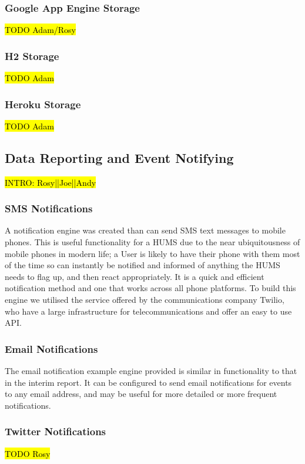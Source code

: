 \documentclass[10pt,a4paper]{article}
\begin{document}
\subsubsection{Google App Engine Storage}
\hl{TODO Adam/Rosy}

\subsubsection{H2 Storage}
\hl{TODO Adam}

\subsubsection{Heroku Storage}
\hl{TODO Adam}

\subsection{Data Reporting and Event Notifying}
\label{sec:report}
\hl{INTRO: Rosy||Joe||Andy}

\subsubsection{SMS Notifications}
A notification engine was created than can send SMS text messages to mobile phones. This is useful functionality for a HUMS due to the near ubiquitousness of mobile phones in modern life; a User is likely to have their phone with them most of the time so can instantly be notified and informed of anything the HUMS needs to flag up, and then react appropriately. It is a quick and efficient notification method and one that works across all phone platforms. To build this engine we utilised the service offered by the communications company Twilio, who have a large infrastructure for telecommunications and offer an easy to use API.

\subsubsection{Email Notifications}
The email notification example engine provided is similar in functionality to that in the interim report. It can be configured to send email notifications for events to any email address, and may be useful for more detailed or more frequent notifications. %

\subsubsection{Twitter Notifications}
\hl{TODO Rosy}
\end{document}
